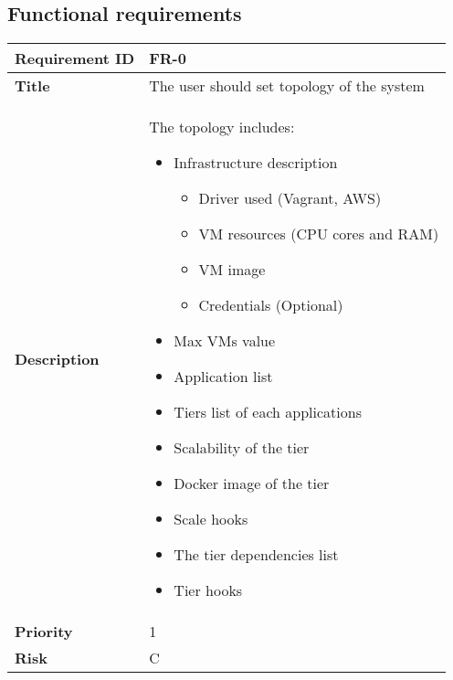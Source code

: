 \subsection{Functional requirements}

\begin{table}[ht]
  \begin{tabular}{|p{3.5cm}|p{8cm}|}
  \hline
    \textbf{Requirement ID}  & FR-0 \\
  \hline
    \textbf{Title}  & \begin{sloppypar}The user should set topology of the system\end{sloppypar}\\
  \hline
    \textbf{Description}  & \begin{sloppypar}The topology includes:
      \begin{itemize}
        \item Infrastructure description
            \begin{itemize}
                \item Driver used (Vagrant, AWS)
                \item VM resources (CPU cores and RAM)
                \item VM image
                \item Credentials (Optional)
            \end{itemize}

        \item Max VMs value
        \item Application list
        \item Tiers list of each applications
        \item Scalability of the tier
        \item Docker image of the tier
        \item Scale hooks
        \item The tier dependencies list
        \item Tier hooks
      \end{itemize}
    \end{sloppypar}\\
  \hline
    \textbf{Priority}  & 1\\
  \hline
    \textbf{Risk}  & C \\
  \hline
  \end{tabular}
\end{table}

